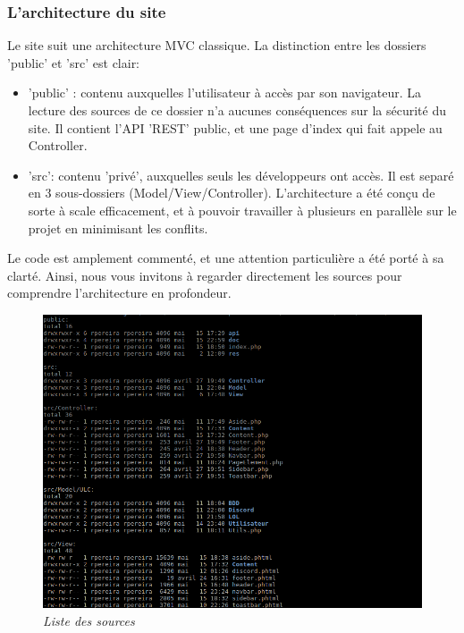 \documentclass[10pt]{article}
\begin{document}
      \subsubsection{L'architecture du site}
	Le site suit une architecture MVC classique.
	La distinction entre les dossiers 'public' et 'src' est clair:
	\begin{itemize}[label=-]
	  \item 'public' : contenu auxquelles l'utilisateur à accès par son navigateur. La lecture des sources de ce dossier n'a aucunes conséquences sur la sécurité du site.
	  Il contient l'API 'REST' public, et une page d'index qui fait appele au Controller.
	  \item 'src': contenu 'privé', auxquelles seuls les développeurs ont accès. Il est separé en 3 sous-dossiers (Model/View/Controller).
	  L'architecture a été conçu de sorte à scale efficacement, et à pouvoir travailler à plusieurs en parallèle sur le projet en minimisant les conflits.
	\end{itemize}
	Le code est amplement commenté, et une attention particulière a été porté à sa clarté.
	Ainsi, nous vous invitons à regarder directement les sources pour comprendre l'architecture en profondeur.
	
      \begin{figure}[H]
	\begin{center}
	  \includegraphics[width=16cm,keepaspectratio]{./images/architecture.png}
	\end{center}
	\caption{\textit{Liste des sources}}
	\label{architecture}
      \end{figure}
      
\end{document}
